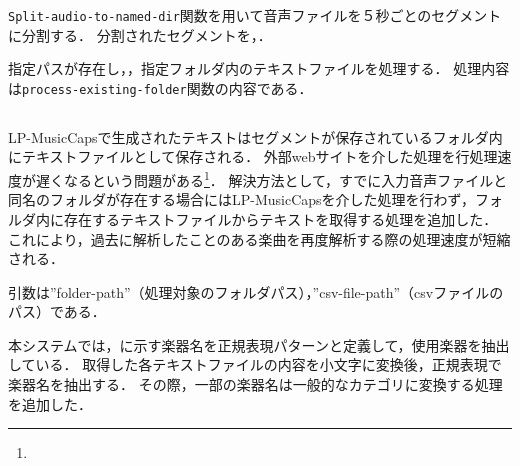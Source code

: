 \verb|Split-audio-to-named-dir|関数を用いて音声ファイルを５秒ごとのセグメントに分割する．
分割されたセグメントを，．

指定パスが存在し，，指定フォルダ内のテキストファイルを処理する．
処理内容は\verb|process-existing-folder|関数の内容である．


\subsection{}


LP-MusicCapsで生成されたテキストはセグメントが保存されているフォルダ内にテキストファイルとして保存される．
外部webサイトを介した処理を行処理速度が遅くなるという問題がある\footnote{}．
解決方法として，すでに入力音声ファイルと同名のフォルダが存在する場合にはLP-MusicCapsを介した処理を行わず，フォルダ内に存在するテキストファイルからテキストを取得する処理を追加した．
これにより，過去に解析したことのある楽曲を再度解析する際の処理速度が短縮される．



引数は”folder-path”（処理対象のフォルダパス），”csv-file-path”（csvファイルのパス）である．

本システムでは，に示す楽器名を正規表現パターンと定義して，使用楽器を抽出している．
取得した各テキストファイルの内容を小文字に変換後，正規表現で楽器名を抽出する．
その際，一部の楽器名は一般的なカテゴリに変換する処理を追加した．

